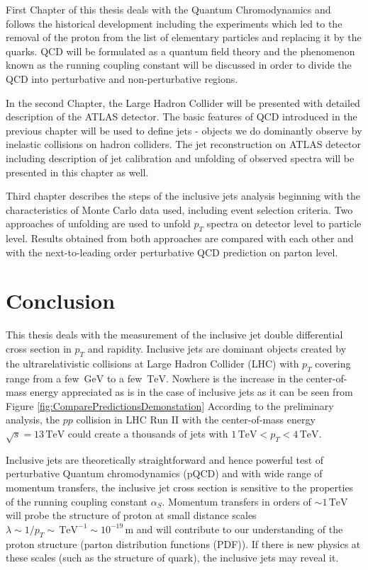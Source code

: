 \documentclass[a4paper,11pt,twoside,openright]{book}
\newcommand{\TeV}{\,\text{TeV}}
\newcommand{\GeV}{\,\text{GeV}}
\newcommand{\pt}{p_{T}}
\begin{document}
First Chapter of this thesis deals with the Quantum Chromodynamics and follows the historical
development including the experiments which led to the removal of the proton from the list
of elementary particles and replacing it by the quarks. QCD will be formulated
as a quantum field theory and the phenomenon known as the running coupling
constant will be discussed in order to divide the QCD into perturbative and
non-perturbative regions.

In the second Chapter, the Large Hadron Collider will be presented with
detailed description of the ATLAS detector. The basic features of QCD
introduced in the previous chapter will be used to define jets - objects we do
dominantly observe by inelastic collisions on hadron colliders. The jet
reconstruction on ATLAS detector including description of jet calibration and
unfolding of observed spectra will be presented in this chapter as well.

Third chapter describes the steps of the inclusive jets analysis beginning with
the characteristics of Monte Carlo data used, including event selection 
criteria. Two approaches of unfolding are used to unfold $\pt$ spectra on
detector level to particle level.  Results obtained from both approaches are
compared with each other and with the next-to-leading order perturbative QCD
prediction on parton level. 






\chapter*{Conclusion}

This thesis deals with the measurement of the inclusive jet double differential
cross section in $\pt$ and rapidity. Inclusive jets are dominant objects created
by the ultrarelativistic collisions at Large Hadron Collider (LHC) with $\pt$
covering range from a few $\GeV$ to a few $\TeV$. Nowhere is the increase in the
center-of-mass energy appreciated as is in the case of inclusive jets as it can
be seen from Figure \ref{fig:ComparePredictionsDemonstation}  According to the
preliminary analysis, the $pp$ collision in LHC Run II with the center-of-mass
energy $\sqrt{s} = 13\TeV$ could create a thousands of jets with $1\TeV < \pt <
4\TeV$.

Inclusive jets are theoretically straightforward and hence powerful test of
perturbative Quantum chromodynamics (pQCD) and with wide range of 
momentum transfers, the inclusive jet cross section is sensitive to the
properties of the running coupling constant $\alpha_S$.  Momentum transfers in
orders of $\sim 1 \TeV$ will probe the structure of proton at small distance
scales $\lambda \sim 1 / \pt \sim \TeV^{-1} \sim 10^{-19} \, \text{m}$ and will
contribute to our understanding of the proton structure (parton distribution
functions (PDF)). If there is new physics at these scales (such as the
structure of quark), the inclusive jets may reveal it.
\end{document}
